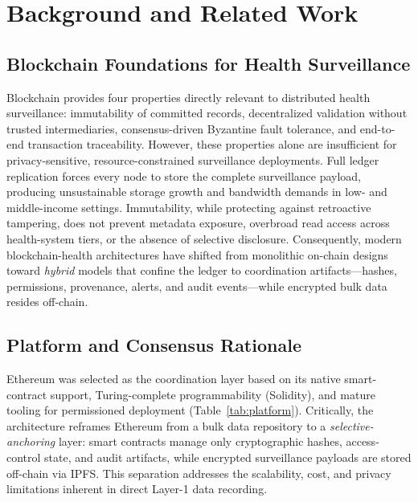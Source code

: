 \section{Background and Related Work}\label{sec:background}

\subsection{Blockchain Foundations for Health Surveillance}\label{subsec:blockchain}

Blockchain provides four properties directly relevant to distributed health surveillance: immutability of committed records, decentralized validation without trusted intermediaries, consensus-driven Byzantine fault tolerance, and end-to-end transaction traceability.\cite{yaga2018blockchain} However, these properties alone are insufficient for privacy-sensitive, resource-constrained surveillance deployments. Full ledger replication forces every node to store the complete surveillance payload, producing unsustainable storage growth and bandwidth demands in low- and middle-income settings. Immutability, while protecting against retroactive tampering, does not prevent metadata exposure, overbroad read access across health-system tiers, or the absence of selective disclosure. Consequently, modern blockchain-health architectures have shifted from monolithic on-chain designs toward \emph{hybrid} models that confine the ledger to coordination artifacts---hashes, permissions, provenance, alerts, and audit events---while encrypted bulk data resides off-chain.

\subsection{Platform and Consensus Rationale}\label{subsec:platform}

Ethereum was selected as the coordination layer based on its native smart-contract support, Turing-complete programmability (Solidity), and mature tooling for permissioned deployment (Table~\ref{tab:platform}). Critically, the architecture reframes Ethereum from a bulk data repository to a \emph{selective-anchoring} layer: smart contracts manage only cryptographic hashes, access-control state, and audit artifacts, while encrypted surveillance payloads are stored off-chain via IPFS. This separation addresses the scalability, cost, and privacy limitations inherent in direct Layer-1 data recording.

